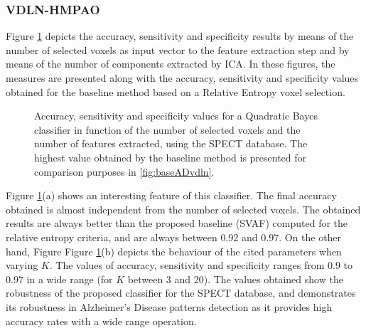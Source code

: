 	\subsubsection{VDLN-HMPAO}
	Figure \ref{fig:icaSPECTTodos} depicts the accuracy, sensitivity and specificity results by means of the number of selected voxels as input vector to the feature extraction step and by means of the number of components extracted by ICA. In these figures, the measures are presented along with the accuracy, sensitivity and specificity values obtained for the baseline method based on a Relative Entropy voxel selection. 
	
	\begin{figure}[bth]
		\myfloatalign
		 \quad
		\caption{Accuracy, sensitivity and specificity values for a Quadratic Bayes classifier in function of the number of selected voxels and the number of features extracted, using the SPECT database. The highest value obtained by the baseline method is presented for comparison purposes in \ref{fig:baseADvdln}.}
		\label{fig:icaSPECTTodos}
	\end{figure}
	
	
	Figure \ref{fig:icaSPECTTodos}(a) shows an interesting feature of this classifier. The final accuracy obtained is almost independent from the number of selected voxels. The obtained results are always better than the proposed baseline (SVAF) computed for the relative entropy criteria, and are always between $0.92$ and $0.97$. On the other hand, Figure Figure \ref{fig:icaSPECTTodos}(b) depicts the behaviour of the cited parameters when varying $K$. The values of accuracy, sensitivity and specificity ranges from $0.9$ to $0.97$ in a wide range (for $K$ between 3 and 20). The values obtained show the robustness of the proposed classifier for the SPECT database, and demonstrates its robustness in Alzheimer's Disease patterns detection as it provides high accuracy rates with a wide range operation.
	
